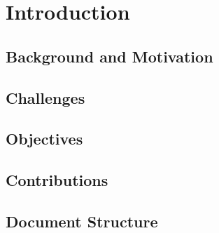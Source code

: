\cleardoublepage
\chapter{Introduction}



\section{Background and Motivation}



\section{Challenges}

\section{Objectives}

\section{Contributions}

\section{Document Structure}